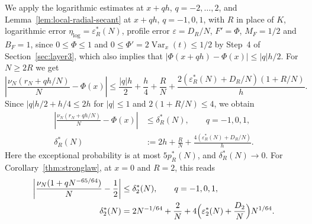 We apply the logarithmic estimates at $x+qh$, $q=-2,\dots,2$, and
Lemma~\ref{lem:local-radial-secant} at $x+qh$, $q=-1,0,1$, with $R$ in
place of $K$, logarithmic error $\eta_{\log}=\varepsilon_R^*(N)$, profile
error $\varepsilon=D_R/N$, $F'=\Phi$, $M_F=1/2$ and $B_F=1$, since
$0\le\Phi\le1$ and $0\le\Phi'=2\operatorname{Var}_x(t)\le1/2$ by Step~4
of Section~\ref{sec:layer3}, which also implies that
$|\Phi(x+qh)-\Phi(x)|\le|q|h/2$. For $N\ge2R$ we get
\[
 \left|\frac{\nu_N(r_N+qh/N)}N-\Phi(x)\right|
 \le\frac{|q|h}2+\frac h4+\frac RN
 +\frac{2(\varepsilon_R^*(N)+D_R/N)(1+R/N)}h.
\]
Since $|q|h/2+h/4\le2h$ for $|q|\le1$ and $2(1+R/N)\le4$, we obtain
\begin{equation}
 \begin{aligned}
 \left|\frac{\nu_N(r_N+qh/N)}N-\Phi(x)\right|
 &\le\delta_R^*(N),\qquad q=-1,0,1,\\
 \delta_R^*(N)&:=2h+\frac RN+\frac{4(\varepsilon_R^*(N)+D_R/N)}h.
 \end{aligned}\label{eq:E1-local}
\end{equation}
Here the exceptional probability is at most $5p_R^*(N)$, and
$\delta_R^*(N)\to0$. For Corollary~\ref{thm:stronglaw}, at $x=0$ and
$R=2$, this reads
\begin{equation}
 \begin{aligned}
 \left|\frac{\nu_N(1+qN^{-65/64})}N-\frac12\right|
 &\le\delta_2^*(N),\qquad q=-1,0,1,\\
 \delta_2^*(N)&=2N^{-1/64}+\frac2N
 +4\Bigl(\varepsilon_2^*(N)+\frac{D_2}N\Bigr)N^{1/64}.
 \end{aligned}
 \label{eq:block-center-crossings}
\end{equation}

